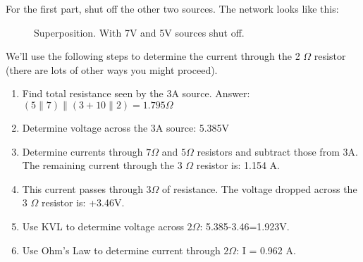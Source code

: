 For the first part, shut off the other two sources. The network looks like this:
\begin{figure}[H]
\begin{center}
\caption{Superposition. With 7V and 5V sources shut off.}
\end{center}
\end{figure}

We'll use the following steps to determine the current through the 2 $\Omega$ resistor (there are lots of other ways you might proceed).

\begin{enumerate}
\item Find total resistance seen by the 3A source. Answer:$(5 \parallel 7)\parallel (3+10 \parallel 2) = 1.795 \Omega$
\item Determine voltage across the 3A source: 5.385V
\item Determine currents through $7 \Omega$ and $5 \Omega$ resistors and subtract those from 3A. The remaining current through the 3 $\Omega$ resistor is: 1.154 A.
\item This current passes through $3 \Omega$ of resistance. The voltage dropped across the 3 $\Omega$ resistor is: +3.46V. 
\item Use KVL to determine voltage across $2 \Omega$: 5.385-3.46=1.923V.
\item Use Ohm's Law to determine current through $2 \Omega$: I = 0.962 A.
\end{enumerate}

